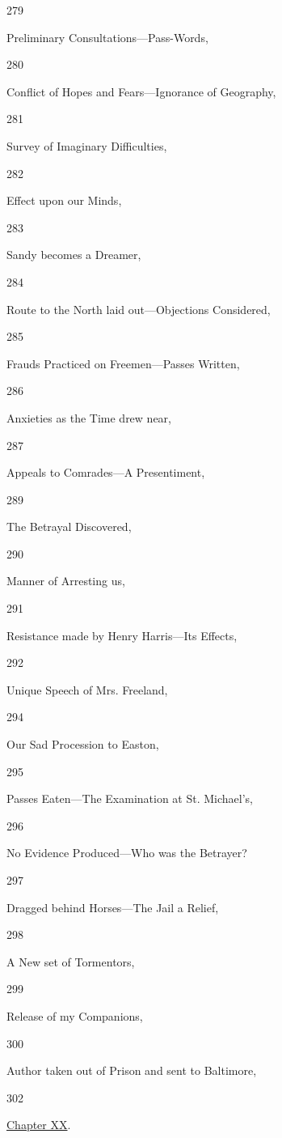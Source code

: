 279

Preliminary Consultations---Pass-Words,

280

Conflict of Hopes and Fears---Ignorance of Geography,

281

Survey of Imaginary Difficulties,

282

Effect upon our Minds,

283

Sandy becomes a Dreamer,

284

Route to the North laid out---Objections Considered,

285

Frauds Practiced on Freemen---Passes Written,

286

Anxieties as the Time drew near,

287

Appeals to Comrades---A Presentiment,

289

The Betrayal Discovered,

290

Manner of Arresting us,

291

Resistance made by Henry Harris---Its Effects,

292

Unique Speech of Mrs. Freeland,

294

Our Sad Procession to Easton,

295

Passes Eaten---The Examination at St. Michael's,

296

No Evidence Produced---Who was the Betrayer?

297

Dragged behind Horses---The Jail a Relief,

298

A New set of Tormentors,

299

Release of my Companions,

300

Author taken out of Prison and sent to Baltimore,

302

\href{/wiki/My_Bondage_and_My_Freedom_(1855)/Chapter_XX}{Chapter XX}.

